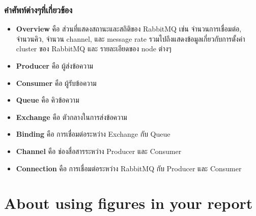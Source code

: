   \subsubsection{คำศัพท์ต่างๆที่เกี่ยวข้อง}
  \begin{itemize}
    \item  \textbf{Overview} คือ ส่วนที่แสดงสถานะและสถิติของ RabbitMQ เช่น จำนวนการเชื่อมต่อ, จำนวนคิว, จำนวน channel, และ message rate รวมไปถึงแสดงข้อมูลเกี่ยวกับการตั้งค่า cluster ของ RabbitMQ และ รายละเอียดของ node ต่างๆ
    \item \textbf{Producer} คือ ผู้ส่งข้อความ
    \item \textbf{Consumer} คือ ผู้รับข้อความ
    \item \textbf{Queue} คือ คิวข้อความ
    \item \textbf{Exchange} คือ ตัวกลางในการส่งข้อความ
    \item \textbf{Binding} คือ การเชื่อมต่อระหว่าง Exchange กับ Queue
    \item \textbf{Channel} คือ ช่องสื่อสารระหว่าง Producer และ Consumer
    \item \textbf{Connection} คือ การเชื่อมต่อระหว่าง RabbitMQ กับ Producer และ Consumer
  \end{itemize}



\section{About using figures in your report}


